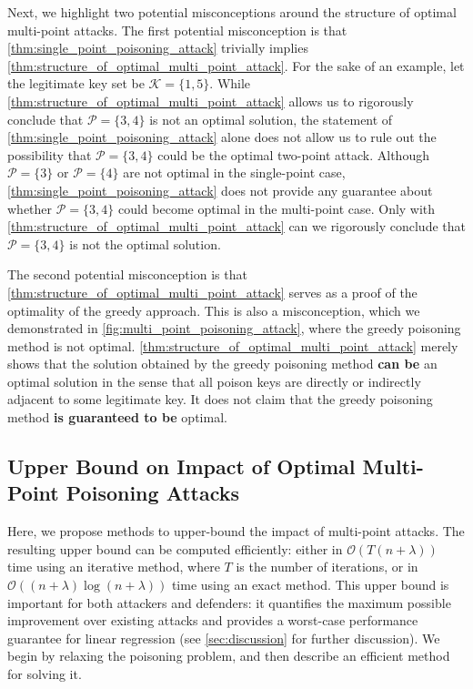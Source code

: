 \documentclass[acmsmall]{acmart}
\begin{document}
Next, we highlight two potential misconceptions around the structure of optimal multi-point attacks.
The first potential misconception is that \cref{thm:single_point_poisoning_attack} trivially implies \cref{thm:structure_of_optimal_multi_point_attack}.
For the sake of an example, let the legitimate key set be $\mathcal{K} = \{1, 5\}$.
While \cref{thm:structure_of_optimal_multi_point_attack} allows us to rigorously conclude that $\mathcal{P} = \{3,4\}$ is not an optimal solution, the statement of \cref{thm:single_point_poisoning_attack} alone does not allow us to rule out the possibility that $\mathcal{P} = \{3,4\}$ could be the optimal two-point attack.
Although $\mathcal{P} = \{3\}$ or $\mathcal{P} = \{4\}$ are not optimal in the single-point case, \cref{thm:single_point_poisoning_attack} does not provide any guarantee about whether $\mathcal{P} = \{3,4\}$ could become optimal in the multi-point case.
Only with \cref{thm:structure_of_optimal_multi_point_attack} can we rigorously conclude that $\mathcal{P} = \{3,4\}$ is not the optimal solution.

The second potential misconception is that \cref{thm:structure_of_optimal_multi_point_attack} serves as a proof of the optimality of the greedy approach.
This is also a misconception, which we demonstrated in \cref{fig:multi_point_poisoning_attack}, where the greedy poisoning method is not optimal.
\cref{thm:structure_of_optimal_multi_point_attack} merely shows that the solution obtained by the greedy poisoning method \textbf{can be} an optimal solution in the sense that all poison keys are directly or indirectly adjacent to some legitimate key.
It does not claim that the greedy poisoning method \textbf{is guaranteed to be} optimal.

\subsection{Upper Bound on Impact of Optimal Multi-Point Poisoning Attacks}
\label{sec:upper_bound_multi_point_poisoning_attack}

Here, we propose methods to upper-bound the impact of multi-point attacks.
The resulting upper bound can be computed efficiently: either in $\mathcal{O}(T(n+\lambda))$ time using an iterative method, where $T$ is the number of iterations, or in $\mathcal{O}((n+\lambda)\log(n+\lambda))$ time using an exact method.
This upper bound is important for both attackers and defenders: it quantifies the maximum possible improvement over existing attacks and provides a worst-case performance guarantee for linear regression (see \cref{sec:discussion} for further discussion).
We begin by relaxing the poisoning problem, and then describe an efficient method for solving it.
\end{document}
